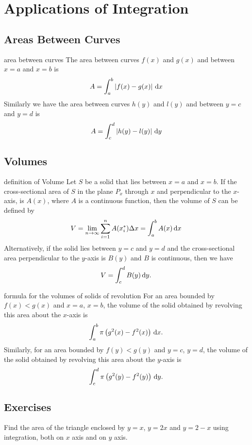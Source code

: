 \documentclass[Calculus 1 Recitation.tex]{subfiles}
\begin{document}
\section{Applications of Integration}
\subsection{Areas Between Curves}

\begin{myleftlinebox}
	area between curves
	\tcblower
	The area between curves $f(x)$ and $g(x)$ and between $x=a$ and $x=b$ is 
	\[A=\int_a^b \left\vert f(x)-g(x)\right\vert\,\mathrm{d} x\]
	Similarly we have the area between curves $h(y)$ and $l(y)$ and between $y=c$ and $y=d$ is
	\[A = \int_c^d \left\vert h(y)-l(y)\right\vert\,\mathrm{d} y\]
\end{myleftlinebox}

\subsection{Volumes}
\begin{myleftlinebox}
	definition of Volume
	\tcblower
	Let $S$ be a solid that lies between $x=a$ and $x=b$. If the cross-sectional area of $S$ in the plane $P_x$ through $x$ and perpendicular to the $x$-axis, is $A(x)$, where $A$ is a continuous function, then the volume of $S$ can be defined by
	\[V = \lim_{n\to\infty} \sum_{i=1}^n A(x_i^*)\Delta x=\int_a^b A(x)\,\mathrm{d} x\]
	Alternatively, if the solid lies between $y=c$ and $y=d$ and the cross-sectional area perpendicular to the $y$-axis is $B(y)$ and $B$ is continuous, then we have \[V = \int_c^d B(y)\,\mathrm{d} y.\]
\end{myleftlinebox}

\begin{myleftlinebox}
	formula for the volumes of solids of revolution
	\tcblower
	For an area bounded by $f(x)<g(x)$ and $x=a$, $x=b$, the volume of the solid obtained by revolving this area about the $x$-axis is
	\[\int_a^b \pi \left( g^2(x)-f^2(x) \right)\,\mathrm{d} x.\]
	Similarly, for an area bounded by $f(y)<g(y)$ and $y=c$, $y=d$, the volume of the solid obtained by revolving this area about the $y$-axis is
	\[\int_c^d \pi \left( g^2(y)-f^2(y) \right)\,\mathrm{d} y.\]
\end{myleftlinebox}

\subsection{Exercises}
\begin{myleftlinebox}
	Find the area of the triangle enclosed by $y=x$, $y=2x$ and $y=2-x$ using integration, both on $x$ axis and on $y$ axis.
	\tcblower
	\vspace{2em}
\end{myleftlinebox}
\end{document}
